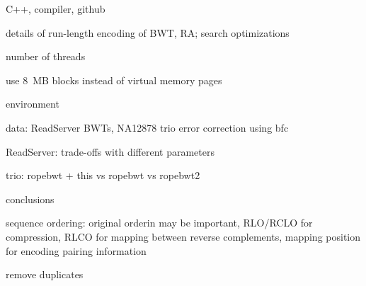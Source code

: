 \documentclass[smallabstract,smallcaptions]{dccpaper}
\begin{document}

C++, compiler, github

details of run-length encoding of BWT, RA; search optimizations

number of threads

use 8~MB blocks instead of virtual memory pages



environment

data: ReadServer BWTs, NA12878 trio \cite{1000GP2015}
error correction using bfc \cite{Li2015}

ReadServer: trade-offs with different parameters

trio: ropebwt + this vs ropebwt vs ropebwt2



conclusions

sequence ordering: original orderin may be important, RLO/RCLO for compression, RLCO for mapping between reverse complements, mapping position for encoding pairing information

remove duplicates




\end{document}
